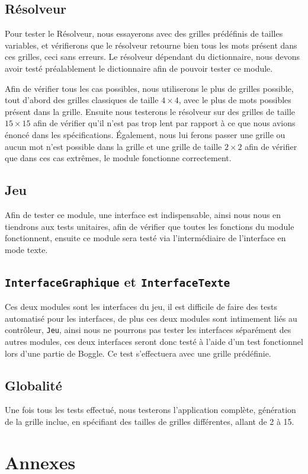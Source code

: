 \documentclass[12pt,a4paper,openany]{article}
\begin{document}
	\subsection{Résolveur}
		Pour tester le Résolveur, nous essayerons avec des grilles prédéfinis de tailles variables, et vérifierons que le résolveur retourne bien tous les
		mots présent dans ces grilles, ceci sans erreurs. Le résolveur dépendant du dictionnaire, nous devons avoir testé préalablement le dictionnaire afin de
		pouvoir tester ce module.

		Afin de vérifier tous les cas possibles, nous utiliserons le plus de grilles possible, tout d'abord des grilles classiques de taille $4\times4$, 
		avec le plus de mots possibles présent dans la grille. Ensuite nous testerons le résolveur sur des grilles de taille $15\times 15$ afin de 
		vérifier qu'il n'est pas trop lent par rapport à ce que nous avions énoncé dans les spécifications. Également, nous lui
		ferons passer une grille ou aucun mot n'est possible dans la grille et une grille de taille $2\times 2$ afin de vérifier que dans ces cas extrêmes, le module fonctionne correctement.

	\subsection{Jeu}
	Afin de tester ce module, une interface est indispensable, ainsi nous nous en tiendrons aux tests unitaires, afin de vérifier que toutes les fonctions du
	module fonctionnent, ensuite ce module sera testé via l'intermédiaire de l'interface en mode texte.

	\subsection{\texttt{InterfaceGraphique} et \texttt{InterfaceTexte}}
	Ces deux modules sont les interfaces du jeu, il est difficile de faire des tests automatisé pour les interfaces, de plus ces deux modules sont intimement
	liés au contrôleur, \texttt{Jeu}, ainsi nous ne pourrons pas tester les interfaces séparément des autres modules, ces deux interfaces seront donc testé à
	l'aide d'un test fonctionnel lors d'une partie de Boggle. Ce test s'effectuera avec une grille prédéfinie.

	\subsection{Globalité}
	Une fois tous les tests effectué, nous testerons l'application complète, génération de la grille inclue, en spécifiant des tailles de grilles différentes,
	allant de 2 à 15.

	\newpage
	\appendix
	\section{Annexes}
	\listoffigures
	\listoftables
	
\end{document}
